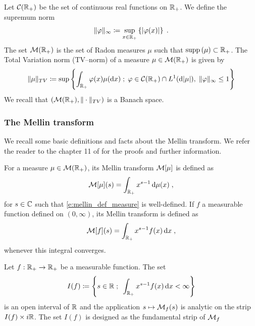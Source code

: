 \documentclass[11pt]{amsart}
\newcommand{\R}{\RR}
\newcommand{\diff}{\,\mathrm{d}}
\newcommand{\dd}{\mathrm{d}}
\newcommand{\supp}{\mathrm{supp}\,}
\begin{document}
Let $\mathcal{C}(\mathbb{R}_+)$ be the set of continuous real functions on $\mathbb{R}_+$. We define the supremum norm
\begin{equation*}
    \|\varphi\|_{\infty} \coloneqq\sup_{x \in \mathbb{R}_+} \left\{ |\varphi(x)| \right\}
    \; .
\end{equation*}
The set $\mathcal{M}(\mathbb{R}_+)$ is the set of Radon measures $\mu$ such that $\supp(\mu) \subset \RR_+$. The Total Variation norm (TV--norm) of a measure $\mu \in \mathcal{M}(\mathbb{R}_+)$ is given by 
    \begin{equation*}
        \|\mu\|_{TV} \coloneqq\sup \left\{ \int_{\RR_+} \varphi(x) \mu(\dd x)\; ; \; \varphi \in \Ccal(\RR_+)\cap L^1(\dd|\mu|),\; \|\varphi\|_{\infty} \leq 1\right\}
    \end{equation*}
We recall that $\left(\mathcal{M}(\mathbb{R}_+), \|\cdot\|_{TV}\right)$ is a Banach space. 

\subsubsection{The Mellin transform}

We recall some basic definitions and facts about the Mellin transform. We refer the reader to the chapter 11 of \cite{misra1986transform} for the proofs and further information. 

\begin{definition} For a measure $\mu \in \Mcal(\R_+)$, its Mellin transform $\mathcal{M}[\mu]$ is defined as 
\begin{equation}
        \label{e:mellin_def_measure}
        \Mcal[\mu](s) = \int_{\RR_+} x^{s-1} \diff \mu(x) \eqfinv
    \end{equation}
    for $s \in \mathbb{C}$ such that \eqref{e:mellin_def_measure} is well-defined.     
If $f$ a measurable function defined on $(0, \infty)$, its Mellin transform is defined as 
\begin{equation}
    \label{e:mellin_def_function}
    \Mcal[f](s) = \int_{\RR_+} x^{s-1} f(x) \diff x \eqfinv
\end{equation}
whenever this integral converges. 
\end{definition}

\begin{lemma}\label{lm:interval_mellin}
    Let $f : \mathbb{R}_+ \to \mathbb{R}_+$ be a measurable function. The set 
    $$
    I(f) \coloneqq \left\{ s \in \RR \eqseppv \int_{\RR_+} x^{s-1} f(x) \diff x < \infty \right\}
    $$ 
    is an open interval of $\mathbb{R}$ and the application $s \mapsto \mathcal{M}_f(s)$ is analytic on the strip $I(f) \times i\mathbb{R}$. 
    The set $I(f)$ is designed as the fundamental strip of $\mathcal{M}_f$
\end{lemma}
\end{document}
